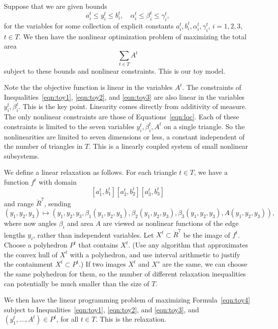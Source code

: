 Suppose that we are given bounds
   \begin{equation}\label{eqn:toy3}
   a_i^t \le y_i^t \le b_i^t,\quad \alpha_i^t \le \beta_i^t \le \gamma_i^t,
   \end{equation}
for the variables for some collection of explicit constants $a_i^t,b_i^t,\alpha_i^t,\gamma_i^t$,
$i=1,2,3$, $t\in T$.  We then have the nonlinear optimization problem of maximizing the total area
   \begin{equation}\label{eqn:toy4}
   \sum_{t\in T} A^t
   \end{equation}
subject to these bounds and  nonlinear constraints.  This is our toy model.

Note the the objective function is linear in the variables $A^t$.  The constraints
of Inequalities~\ref{eqn:toy1}, \ref{eqn:toy2}, and \ref{eqn:toy3} are also linear in
the variables $y^t_i,\beta^t_i$.  This is the key point.  Linearity comes directly
from additivity of measure.
The only nonlinear constraints are those of 
Equations~\ref{eqn:loc}.  Each of these constraints is limited to the seven variables
$y_i^t,\beta_i^t,A^t$ on  a single triangle.  So the nonlinearities are limited to seven
dimensions or less, a constant independent of the number of triangles in $T$.  This is a linearly
coupled system of small nonlinear subsystems.

We define a linear relaxation as follows.  For each triangle $t\in T$, we have a function
$f^t$ with domain
  $$
   [a^t_1,b^t_1][a^t_2,b^t_2][a^t_3,b^t_3]
  $$
and range $\ring{R}^7$, sending
  $$
  (y_1,y_2,y_3)\mapsto (y_1,y_2,y_3,\beta_1(y_1,y_2,y_3),\beta_2(y_1,y_2,y_3),\beta_3(y_1,y_2,y_3),
       A(y_1,y_2,y_3)),
  $$
where now angles $\beta_i$ and area $A$ are viewed as nonlinear functions of the edge lengths $y_i$,
rather than independent variables.
Let $X^t\subset\ring{R}^7$ be the image of $f^t$.
Choose a polyhedron $P^t$ that contains $X^t$.  (Use any algorithm that approximates the
convex hull of $X^t$ with a polyhedron, and use interval arithmetic to justify the containment
$X^t\subset P^t$.)   If two images $X^t$ and $X^s$ are the same, 
we can choose the same polyhedron for them, so the number of different relaxation inequalities
can potentially be much smaller than the size of $T$.

We then have the linear programming problem
of maximizing Formula~\ref{eqn:toy4} subject to 
Inequalities~\ref{eqn:toy1}, \ref{eqn:toy2}, and \ref{eqn:toy3}, 
and $(y^t_1,\ldots,A^t)\in P^t$, for all $t\in T$.  This is the relaxation.

